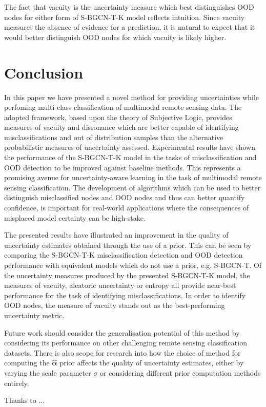 \documentclass[
twocolumn,
]{ceurart}
\begin{document}
The fact that vacuity is the uncertainty measure which best distinguishes OOD nodes for either form of S-BGCN-T-K model reflects intuition.
Since vacuity measures the absence of evidence for a prediction, it is natural to expect that it would better distinguish OOD nodes for which vacuity is likely higher.

\section{Conclusion}
\label{sec::conclusion}

In this paper we have presented a novel method for providing uncertainties while perfoming multi-class classification of multimodal remote sensing data.
The adopted framework, based upon the theory of Subjective Logic, provides measures of vacuity and dissonance which are better capable of identifying misclassifications and out of distribution samples than the alternative probabilistic measures of uncertainty assessed.
Experimental results have shown the performance of the S-BGCN-T-K model in the tasks of misclassification and OOD detection to be improved against baseline methods.
This represents a promising avenue for uncertainty-aware learning in the task of multimodal remote sensing classification.
The development of algorithms which can be used to better distinguish misclassified nodes and OOD nodes and thus can better quantify confidence, is important for real-world applications where the consequences of misplaced model certainty can be high-stake.

The presented results have illustrated an improvement in the quality of uncertainty estimates obtained through the use of a prior.
This can be seen by comparing the S-BGCN-T-K misclassification detection and OOD detection performance with equivalent models which do not use a prior, e.g. S-BGCN-T.
Of the uncertainty measures produced by the presented S-BGCN-T-K model, the measures of vacuity, aleatoric uncertainty or entropy all provide near-best performance for the task of identifying misclassifications.
In order to identify OOD nodes, the measure of vacuity stands out as the best-performing   uncertainty metric.

Future work should consider the generalisation potential of this method by considering its performance on other challenging remote sensing classification datasets. There is also scope for research into how the choice of method for computing the $\hat{\boldsymbol{\alpha}}$ prior affects the quality of uncertainty estimates, either by varying the scale parameter $\sigma$ or considering different prior computation methods entirely.
\begin{acknowledgments}
  Thanks to ...
\end{acknowledgments}


\end{document}
